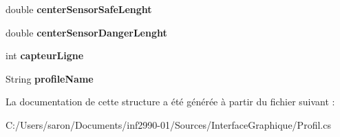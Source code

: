 \begin{DoxyCompactItemize}
\item 
\hypertarget{struct_interface_graphique_1_1_profile_data_ad8c2fed74e90028a0a185b9cef6074fd}{double {\bfseries center\-Sensor\-Safe\-Lenght}}\label{struct_interface_graphique_1_1_profile_data_ad8c2fed74e90028a0a185b9cef6074fd}

\item 
\hypertarget{struct_interface_graphique_1_1_profile_data_a779b56c6a7c3f5f3b38b2093643aeb13}{double {\bfseries center\-Sensor\-Danger\-Lenght}}\label{struct_interface_graphique_1_1_profile_data_a779b56c6a7c3f5f3b38b2093643aeb13}

\item 
\hypertarget{struct_interface_graphique_1_1_profile_data_a82739a4306b72f97cd249d37d38c8dc3}{int {\bfseries capteur\-Ligne}}\label{struct_interface_graphique_1_1_profile_data_a82739a4306b72f97cd249d37d38c8dc3}

\item 
\hypertarget{struct_interface_graphique_1_1_profile_data_acbec6e2ee18e60a10d5adcf0015b272e}{String {\bfseries profile\-Name}}\label{struct_interface_graphique_1_1_profile_data_acbec6e2ee18e60a10d5adcf0015b272e}

\end{DoxyCompactItemize}


La documentation de cette structure a été générée à partir du fichier suivant \-:\begin{DoxyCompactItemize}
\item 
C\-:/\-Users/saron/\-Documents/inf2990-\/01/\-Sources/\-Interface\-Graphique/Profil.\-cs\end{DoxyCompactItemize}
